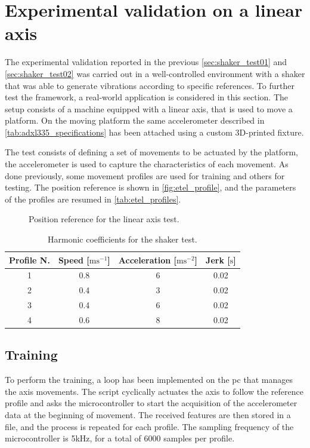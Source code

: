 \clearpage
\section{Experimental validation on a linear axis}
\label{sec:ExperimentalValidation}

The experimental validation reported in the previous \autoref{sec:shaker_test01} and \autoref{sec:shaker_test02} was carried out in a well-controlled environment with a shaker that was able to generate vibrations according to specific references. To further test the framework, a real-world application is considered in this section. The setup consists of a machine equipped with a linear axis, that is used to move a platform. On the moving platform the same accelerometer described in \autoref{tab:adxl335_specifications} has been attached using a custom 3D-printed fixture.

The test consists of defining a set of movements to be actuated by the platform, the accelerometer is used to capture the characteristics of each movement. As done previously, some movement profiles are used for training and others for testing. The position reference is shown in \autoref{fig:etel_profile}, and the parameters of the profiles are resumed in \autoref{tab:etel_profiles}.

\begin{figure}
    \centering
    \todo%
    \caption{Position reference for the linear axis test.}
    \label{fig:etel_profile}
\end{figure}

\begin{table}
    \centering
    \caption{Harmonic coefficients for the shaker test.}
    \label{tab:etel_profiles}
    \begin{tabular}{cccc} 
    \toprule
    \textbf{Profile N.} & \textbf{Speed} {[}$\text{m}\text{s}^{-1}$] & \textbf{Acceleration} {[}$\text{m}\text{s}^{-2}$] & \textbf{Jerk} {[}$\text{s}$] \\ 
    \hline
    1 & 0.8 & 6 & 0.02 \\
    2 & 0.4 & 3 & 0.02 \\
    3 & 0.4 & 6 & 0.02 \\
    4 & 0.6 & 8 & 0.02 \\
    \bottomrule
\end{tabular}
\end{table}

\subsection{Training}
To perform the training, a loop has been implemented on the \gls{pc} that manages the axis movements. The script cyclically actuates the axis to follow the reference profile and asks the microcontroller to start the acquisition of the accelerometer data at the beginning of movement. The received features are then stored in a file, and the process is repeated for each profile. The sampling frequency of the microcontroller is 5kHz, for a total of 6000 samples per profile. 

